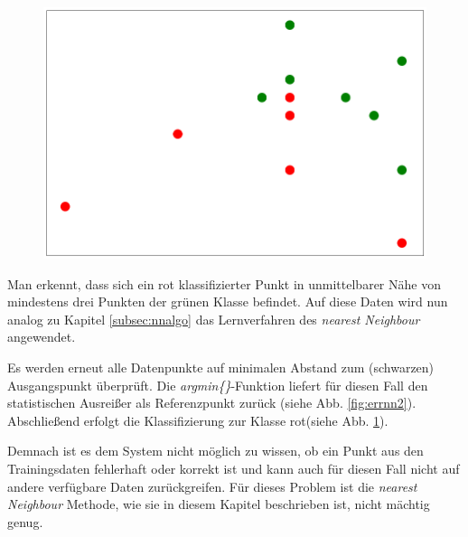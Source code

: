 \documentclass[fontsize=11pt]{scrartcl}
\begin{document}
                \begin{figure}
                    \includegraphics[scale=0.2]{errnn3.png}
                \label{fig:errnn3}  
                \end{figure}
                
                  Man erkennt, dass sich ein rot klassifizierter Punkt in unmittelbarer Nähe von mindestens drei Punkten der grünen Klasse befindet. %
                   Auf diese Daten wird nun analog zu Kapitel \ref{subsec:nnalgo} das Lernverfahren des \emph{nearest Neighbour} angewendet.\par
                
                Es werden erneut alle Datenpunkte auf minimalen Abstand zum (schwarzen) Ausgangspunkt überprüft. Die \emph{argmin\{\}}-Funktion liefert für diesen Fall den statistischen Ausreißer als Referenzpunkt zurück (siehe Abb. \ref{fig:errnn2}). Abschließend erfolgt die Klassifizierung zur Klasse rot(siehe Abb. \ref{fig:errnn3}).\par
                Demnach ist es dem System nicht möglich zu wissen, ob ein Punkt aus den Trainingsdaten fehlerhaft oder korrekt ist und kann auch für diesen Fall nicht auf andere verfügbare Daten zurückgreifen. Für dieses Problem ist die \emph{nearest Neighbour} Methode, wie sie in diesem Kapitel beschrieben ist, nicht mächtig genug.
                         
\end{document}
